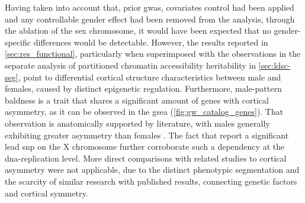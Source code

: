 Having taken into account  that, prior \ac{gwas}, covariates control had been applied and any controllable gender effect had been removed from the analysis, through the ablation of the sex chromosome, it would have been expected that no gender-specific differences would be detectable. However, the results reported in \autoref{sec:res_functional}, particularly when superimposed with the observations in the separate analysis of partitioned chromatin accessibility heritability in \autoref{sec:ldsc-seg}, point to differential cortical structure characteristics between male and females, caused by distinct epigenetic regulation. Furthermore, male-pattern baldness is a trait that shares a significant amount of genes with cortical asymmetry, as it can be observed in the \ac{gsea} (\autoref{fig:gw_catalog_genes}). That observation is anatomically supported by literature, with males generally exhibiting greater asymmetry than females \cite{Guadalupe2015}.   The fact that \citet{Sha2021} report a significant lead \ac{snp} on the X chromosome further corroborate such a dependency at the \ac{dna}-replication level. More direct comparisons with related studies to cortical asymmetry were not applicable,  due to the distinct phenotypic segmentation and the scarcity of similar research with published results, connecting genetic factors and cortical symmetry.




